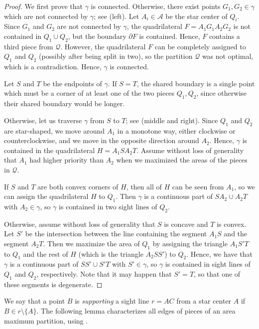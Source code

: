 \documentclass{theoretics}
\begin{document}
\begin{proof}
We first prove that $\gamma$ is connected.
Otherwise, there exist points $G_1,G_2\in\gamma$ which are not connected by $\gamma$; see  (left).
Let $A_i\in\mathcal A$ be the star center of $Q_i$.
Since $G_1$ and $G_2$ are not connected by $\gamma$, the quadrilateral $F=A_1G_1A_2G_2$ is not contained in $Q_1\cup Q_2$, but the boundary $\partial F$ is contained.
Hence, $F$ contains a third piece from $\mathcal Q$.
However, the quadrilateral $F$ can be completely assigned to $Q_1$ and $Q_2$ (possibly after being split in two), so the partition $\mathcal Q$ was not optimal, which is a contradiction.
Hence, $\gamma$ is connected.

Let $S$ and $T$ be the endpoints of $\gamma$.
If $S=T$, the shared boundary is a single point which must be a corner of at least one of the two pieces $Q_1,Q_2$, since otherwise their shared boundary would be longer.

Otherwise, let us traverse $\gamma$ from $S$ to $T$; see  (middle and right).
Since $Q_1$ and $Q_2$ are star-shaped, we move around $A_1$ in a monotone way, either clockwise or counterclockwise, and we move in the opposite direction around $A_2$.
Hence, $\gamma$ is contained in the quadrilateral $H=A_1SA_2T$.
Assume without loss of generality that $A_1$ had higher priority than $A_2$ when we maximized the areas of the pieces in $\mathcal Q$.

If $S$ and $T$ are both convex corners of $H$, then all of $H$ can be seen from $A_1$, so we can assign the quadrilateral $H$ to $Q_1$. Then $\gamma$ is a continuous part of $SA_2\cup A_2T$ with $A_2 \in \gamma$, so $\gamma$ is contained in two sight lines of $Q_2$.

Otherwise, assume without loss of generality that $S$ is concave and $T$ is convex.
Let $S'$ be the intersection between the line containing the segment $A_1S$ and the segment $A_2T$.
Then we maximize the area of $Q_1$ by assigning the triangle $A_1S'T$ to $Q_1$ and the rest of $H$ (which is the triangle $A_2SS'$) to $Q_2$.
Hence, we have that $\gamma$ is a continuous part of $SS'\cup S'T$ with $S' \in \gamma$, so $\gamma$ is contained in sight lines of $Q_1$ and $Q_2$, respectively.
Note that it may happen that $S'=T$, so that one of these segments is degenerate.
\end{proof}

We say that a point $B$ is \emph{supporting} a sight line $r=AC$ from a star center $A$ if $B\in r\setminus\{A\}$.
The following lemma characterizes all edges of pieces of an area maximum partition, using .
\end{document}
